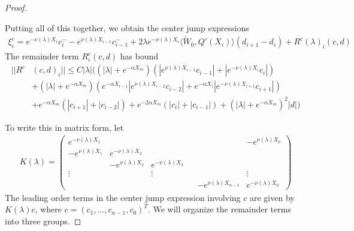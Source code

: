 \documentclass[thesis.tex]{subfiles}
\begin{document}
\begin{lemma}
\begin{proof}
\begin{enumerate}
\end{enumerate}

Putting all of this together, we obtain the center jump expressions
\begin{align*}
\xi^c_i = e^{-\nu(\lambda) X_i} c_i^- - e^{\nu(\lambda) X_{i-1}} c_{i-1}^- + 2 \lambda e^{-\nu(\lambda)X_i} \langle \tilde{W}_0, Q'(X_i) \rangle (d_{i+1} - d_i )  + R^c(\lambda)_i(c, d)
\end{align*}
The remainder term $R^c_i(c, d)$ has bound
\begin{align*}
||R^c&(c, d)_i|| \leq C |\lambda| \Big(
(|\lambda| + e^{-\alpha X_m})(|e^{\nu(\lambda)X_{i-1}}c_{i-1}| + |e^{-\nu(\lambda)X_i}c_i|) \\
&+ (|\lambda| + e^{-\alpha X_m})( e^{-\alpha X_{i-1}} |e^{\nu(\lambda)X_{i-2}}c_{i-2}| + e^{-\alpha X_i} |e^{-\nu(\lambda)X_{i+1}}c_{i+1}|)  \\
&+ e^{-\alpha X_m}(|c_{i+1}|+|c_{i-2}|) + e^{-2 \alpha X_m}(|c_i|+|c_{i-1}|) + (|\lambda| + e^{-\alpha X_m})^2 |d|
\Big)
\end{align*}

To write this in matrix form, let
\begin{align*}
K(\lambda) =  
\begin{pmatrix}
e^{-\nu(\lambda)X_1} & & & & & -e^{\nu(\lambda)X_0} \\
-e^{\nu(\lambda)X_1} & e^{-\nu(\lambda)X_2} \\
& -e^{\nu(\lambda)X_2} & e^{-\nu(\lambda)X_3} \\
\vdots & & \vdots & &&  \vdots \\
& & & & -e^{\nu(\lambda)X_{n-1}} & e^{-\nu(\lambda)X_0}
\end{pmatrix}
\end{align*}
The leading order terms in the center jump expression involving $c$ are given by $K(\lambda)c$, where $c = (c_1, \dots, c_{n-1}, c_0)^T$. We will organize the remainder terms into three groups.


\end{proof}
\end{lemma}
\end{document}
